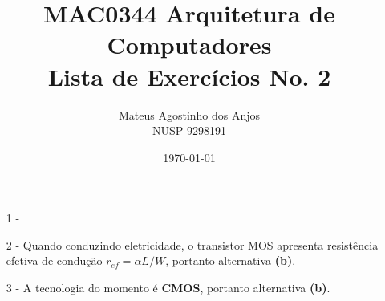 \documentclass[12pt]{article}
\title{MAC0344 Arquitetura de Computadores\\
Lista de Exercícios No. 2
}
\author{Mateus Agostinho dos Anjos\\NUSP 9298191}
\date{\today}
\begin{document}
	\maketitle
	\begin{itemize}
		\item[1 -]
		
		\item[2 -]
			Quando conduzindo eletricidade, o transistor MOS apresenta
			resistência efetiva de condução $r_{ef} = \alpha L/W$,
			portanto alternativa \textbf{(b)}.
		\item[3 -]
			A tecnologia do momento é \textbf{CMOS}, portanto
			alternativa \textbf{(b)}.
	\end{itemize}
\end{document}
